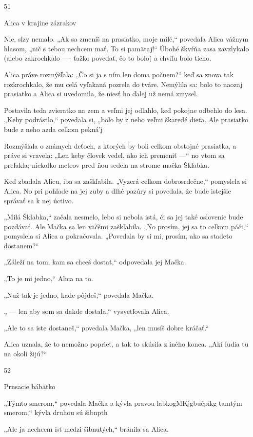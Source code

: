 \documentclass[12pt]{book}
\begin{document}
\begin{Parallel}[p]{}{}
{51

Alica v krajine zázrakov

Nie, slzy nemalo. „Ak sa zmeníš na prasiatko, moje milé,“
povedala Alica vážnym hlasom, „nič s tebou nechcem mať.
To si pamätaj!“ Úbohé škvŕňa zasa zavzlykalo (alebo
zakrochkalo —- ťažko povedať, čo to bolo) a chvíľu bolo
ticho.

Alica práve rozmýšľala: „Čo si ja s ním len doma
počnem?“ keď sa znova tak rozkrochkalo, že mu celá
vyľakaná pozrela do tváre. Nemýlila sa: bolo to naozaj
prasiatko a Alica si uvedomila, že niesť ho ďalej už nemá
zmysel.

Postavila teda zvieratko na zem a veľmi jej odľahlo, keď
pokojne odbehlo do lesa. „Keby podrástlo,“ povedala si,
„bolo by z neho veľmi škaredé dieťa. Ale prasiatko bude
z neho azda celkom pekná'j

Rozmýšľala o známych deťoch, z ktorých by boli celkom
obstojné prasiatka, a práve si vravela: „Len keby človek
vedel, ako ich premeniť —“ no vtom sa preľakla; niekoľko
metrov pred ňou sedela na strome mačka Škľabka.

Keď zbadala Alicu, iba sa zaškľabila. „Vyzerá celkom
dobrosrdečne,“ pomyslela si Alica. No pri pohľade na jej
zuby a dlhé pazúry si povedala, že bude istejšie správať sa
k nej úctivo.

„Milá Škľabka,“ začala nesmelo, lebo si nebola istá, či sa
jej také oslovenie bude pozdávať. Ale Mačka sa len väčšmi
zaškľabila. „No prosím, jej sa to celkom páči,“ pomyslela si
Alica a pokračovala. „Povedala by si mi, prosím, ako sa
stadeto dostanem?“

„Záleží na tom, kam sa chceš dostať,“ odpovedala jej
Mačka.

„To je mi jedno,“ Alica na to.

„Nuž tak je jedno, kade pôjdeš,“ povedala Mačka.

„ — len aby som sa dakde dostala,“ vysvetľovala Alica.

„Ale to sa iste dostaneš,“ povedala Mačka, „len musíš
dobre kráčať.“

Alica uznala, že to nemožno poprieť, a tak to skúsila
z iného konca. „Akí ľudia tu na okolí žijú?“

52

Prnsacie bábätko

„Týmto smerom,“ povedala Mačka a kývla pravou
labkogMKjgbučpíkg tamtým smerom,“ kývla druhou
sú šibnpth

„Ale ja nechcem ísť medzi šibnutých,“ bránila sa Alica.

}
\end{Parallel}
\end{document}
